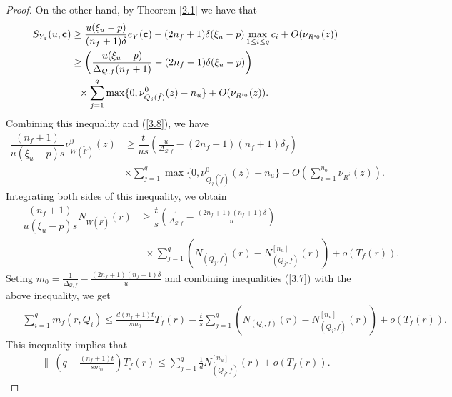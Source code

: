 \documentclass[12pt,leqno]{amsart}
\numberwithin{equation}{section}
\begin{document}
\begin{proof}
On the other hand, by Theorem \ref{2.1} we have that 
\begin{align*}
 S_{Y_z}(u,{\bf c}) &\ge\frac{u(\xi_u-p)}{(n_f+1)\delta}e_Y({\bf c})-(2n_f+1)\delta(\xi_u-p)\max_{1\le i\le q}c_{i}+O(\nu_{R^{i_0}}(z))\\
&\ge\left(\frac{u(\xi_u-p)}{\Delta_{\mathcal Q,f}(n_f+1)}-(2n_f+1)\delta(\xi_u-p)\right)\\
&\ \ \times \sum_{j=1}^{q}\max\{0,\nu^0_{Q_j(\tilde f)}(z)-n_u\}+O(\nu_{R^{i_0}}(z)).
\end{align*}
Combining this inequality and (\ref{3.8}), we have
\begin{align*}
\dfrac{(n_f+1)}{u(\xi_u-p)s}\nu^0_{W(\tilde F)}(z)&\ge\dfrac{t}{us}\left(\frac{u}{\Delta_{\mathcal Q,f}}-(2n_f+1)(n_f+1)\delta_f\right )\\
&\times\sum_{j=1}^{q}\max\{0,\nu^0_{Q_j(\tilde f)}(z)-n_u\}+O(\sum_{i=1}^{n_0}\nu_{R^{i}}(z)).
\end{align*}
Integrating both sides of this inequality, we obtain 
\begin{align*}
\biggl \|\ \dfrac{(n_f+1)}{u(\xi_u-p)s}N_{W(\tilde F)}(r)&\ge \dfrac{t}{s}\left(\frac{1}{\Delta_{\mathcal Q,f}}-\frac{(2n_f+1)(n_f+1)\delta}{u}\right )\\
&\ \ \times\sum_{j=1}^{q}\left(N_{(Q_j,f)}(r)-N^{[n_u]}_{(Q_j,f)}(r)\right)+o(T_f(r)).
\end{align*}
Seting $m_0=\frac{1}{\Delta_{\mathcal Q,f}}-\frac{(2n_f+1)(n_f+1)\delta}{u}$ and combining inequalities (\ref{3.7}) with the above inequality, we get
\begin{align*}
\biggl\|\ \sum_{i=1}^{q}m_f(r,Q_i)\le \frac{d(n_f+1)t}{sm_0}T_f(r)-\frac{t}{s}\sum_{j=1}^{q}\left(N_{(Q_i,f)}(r)-N^{[n_u]}_{(Q_j,f)}(r)\right)+o(T_f(r)).
\end{align*}
This inequality implies that
\begin{align}\label{3.9}
\biggl\|\ \left(q-\frac{(n_f+1)t}{sm_0}\right)T_f(r)\le\sum_{j=1}^{q}\frac{1}{d}N^{[n_u]}_{(Q_j,f)}(r)+o(T_f(r)).
\end{align}


\end{proof}
\end{document}
